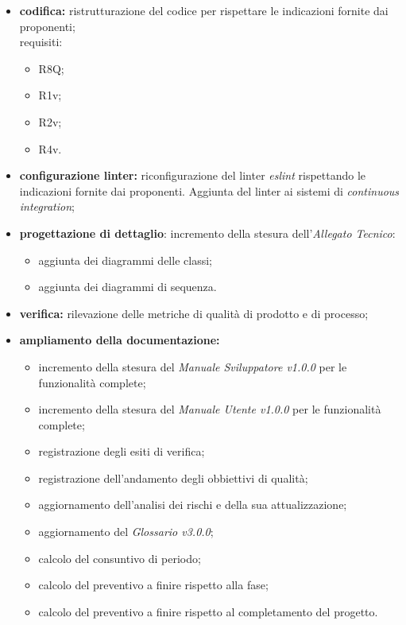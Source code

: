 \begin{itemize}
    \item \textbf{codifica:} ristrutturazione del codice per rispettare le indicazioni fornite dai proponenti;\\ requisiti:
          \begin{itemize}
              \item R8Q;
              \item R1v;
              \item R2v;
              \item R4v.
          \end{itemize}
    \item \textbf{configurazione linter:} riconfigurazione del linter \textit{eslint} rispettando le indicazioni fornite dai proponenti. Aggiunta del linter ai sistemi di \textit{continuous integration};
    \item \textbf{progettazione di dettaglio}: incremento della stesura dell'\textit{Allegato Tecnico}:
          \begin{itemize}
              \item aggiunta dei diagrammi delle classi;
              \item aggiunta dei diagrammi di sequenza.
          \end{itemize}
    \item \textbf{verifica:} rilevazione delle metriche di qualità di prodotto e di processo;
    \item \textbf{ampliamento della documentazione:}
          \begin{itemize}
              \item incremento della stesura del \textit{Manuale Sviluppatore v1.0.0} per le funzionalità complete;
              \item incremento della stesura del \textit{Manuale Utente v1.0.0} per le funzionalità complete;
              \item registrazione degli esiti di verifica;
              \item registrazione dell'andamento degli obbiettivi di qualità;
              \item aggiornamento dell'analisi dei rischi e della sua attualizzazione;
              \item aggiornamento del \textit{Glossario v3.0.0};
              \item calcolo del consuntivo di periodo;
              \item calcolo del preventivo a finire rispetto alla fase;
              \item calcolo del preventivo a finire rispetto al completamento del progetto.
          \end{itemize}
\end{itemize}
